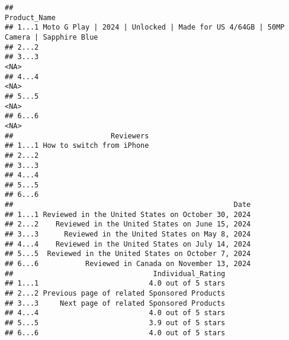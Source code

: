 \documentclass[
  11pt,
]{article}
\begin{document}
\begin{verbatim}
##                                                                           Product_Name
## 1...1 Moto G Play | 2024 | Unlocked | Made for US 4/64GB | 50MP Camera | Sapphire Blue
## 2...2                                                                                 
## 3...3                                                                             <NA>
## 4...4                                                                             <NA>
## 5...5                                                                             <NA>
## 6...6                                                                             <NA>
##                       Reviewers
## 1...1 How to switch from iPhone
## 2...2                          
## 3...3                          
## 4...4                          
## 5...5                          
## 6...6                          
##                                                    Date
## 1...1 Reviewed in the United States on October 30, 2024
## 2...2    Reviewed in the United States on June 15, 2024
## 3...3      Reviewed in the United States on May 8, 2024
## 4...4    Reviewed in the United States on July 14, 2024
## 5...5  Reviewed in the United States on October 7, 2024
## 6...6           Reviewed in Canada on November 13, 2024
##                                 Individual_Rating
## 1...1                          4.0 out of 5 stars
## 2...2 Previous page of related Sponsored Products
## 3...3     Next page of related Sponsored Products
## 4...4                          4.0 out of 5 stars
## 5...5                          3.9 out of 5 stars
## 6...6                          4.0 out of 5 stars

\end{verbatim}
\end{document}
